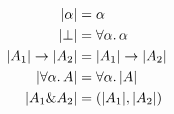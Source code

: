 
\begin{align*}
  \lvert \alpha \rvert                    &= \alpha \\
  \lvert \bot \rvert                      &= \forall \alpha.\, \alpha \\
  \lvert A_1 \rvert \to \lvert A_2 \rvert &= \lvert A_1 \rvert \to \lvert A_2 \rvert \\
  \lvert \forall \alpha.\, A \rvert        &= \forall \alpha.\, \lvert A \rvert \\
  \lvert A_1 \& A_2 \rvert &= (\lvert A_1 \rvert, \lvert A_2 \rvert) \\
\end{align*}
